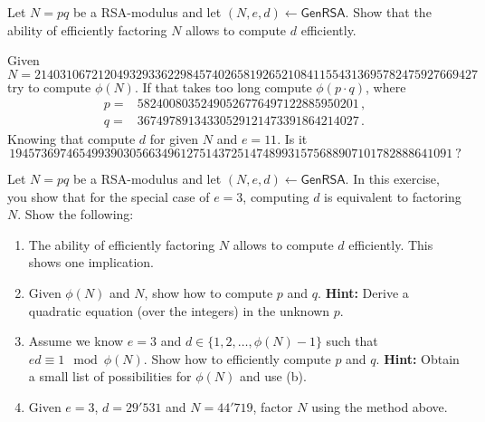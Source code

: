 \documentclass[a4paper,10pt,landscape,twocolumn]{scrartcl}
\begin{document}
\begin{exercise}[RSA]
\begin{subex}
Let $N=pq$ be a RSA-modulus and let
  $(N,e,d) \leftarrow \mathsf{GenRSA}$. 
Show that the ability of efficiently factoring $N$ allows to compute $d$
  efficiently.
  
  Given 
  \begin{equation*}
  N=2140310672120493293362298457402658192652108411554313695782475927669427
  \end{equation*}
  try to compute $\phi(N)$. If that takes too long compute $\phi(p\cdot q)$, where 
  \begin{align*}
  p=&58240080352490526776497122885950201 \, ,\\
  q=&36749789134330529121473391864214027 \, .
  \end{align*}
  Knowing that compute $d$ for given $N$ and $e=11$. Is it 
  \begin{equation*}
  1945736974654993903056634961275143725147489931575688907101782888641091 \  ?
  \end{equation*}
\end{subex}

\begin{subex}
Let $N=pq$ be a RSA-modulus and let
 $(N,e,d) \leftarrow \mathsf{GenRSA}$. In this exercise, you show
 that for the special case of $e=3$, computing $d$ is equivalent to
 factoring $N$. Show the following:
 \begin{enumerate}
 \item The ability of efficiently factoring $N$ allows to compute $d$
 efficiently. This shows one implication.
 \item Given $\phi(N)$ and $N$, show how to compute $p$ and $q$. 
\textbf{Hint:} Derive a quadratic equation (over the integers) in the
   unknown $p$.
   \item Assume we know $e=3$ and $d \in \{1,2,\ldots,\phi(N)-1\}$ such
   that $ed \equiv 1 \mod \phi(N)$. Show how to efficiently compute
   $p$ and $q$. \textbf{Hint:} Obtain a small list of possibilities for
   $\phi(N)$ and use (b).
   \item Given $e=3$, $d=29'531$ and $N=44'719$, factor $N$ using the
 method above.
 \end{enumerate}
\end{subex}
\end{exercise}
\end{document}
